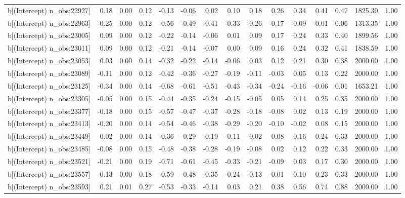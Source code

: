 \begin{table}[ht]
\begin{tabular}{rrrrrrrrrrrrrrr}
  b[(Intercept) n\_obs:22927] & 0.18 & 0.00 & 0.12 & -0.13 & -0.06 & 0.02 & 0.10 & 0.18 & 0.26 & 0.34 & 0.41 & 0.47 & 1825.30 & 1.00 \\ 
  b[(Intercept) n\_obs:22963] & -0.25 & 0.00 & 0.12 & -0.56 & -0.49 & -0.41 & -0.33 & -0.26 & -0.17 & -0.09 & -0.01 & 0.06 & 1313.35 & 1.00 \\ 
  b[(Intercept) n\_obs:23005] & 0.09 & 0.00 & 0.12 & -0.22 & -0.14 & -0.06 & 0.01 & 0.09 & 0.17 & 0.24 & 0.33 & 0.40 & 1899.56 & 1.00 \\ 
  b[(Intercept) n\_obs:23011] & 0.09 & 0.00 & 0.12 & -0.21 & -0.14 & -0.07 & 0.00 & 0.09 & 0.16 & 0.24 & 0.32 & 0.41 & 1838.59 & 1.00 \\ 
  b[(Intercept) n\_obs:23053] & 0.03 & 0.00 & 0.14 & -0.32 & -0.22 & -0.14 & -0.06 & 0.03 & 0.12 & 0.21 & 0.30 & 0.38 & 2000.00 & 1.00 \\ 
  b[(Intercept) n\_obs:23089] & -0.11 & 0.00 & 0.12 & -0.42 & -0.36 & -0.27 & -0.19 & -0.11 & -0.03 & 0.05 & 0.13 & 0.22 & 2000.00 & 1.00 \\ 
  b[(Intercept) n\_obs:23125] & -0.34 & 0.00 & 0.14 & -0.68 & -0.61 & -0.51 & -0.43 & -0.34 & -0.24 & -0.16 & -0.06 & 0.01 & 1653.21 & 1.00 \\ 
  b[(Intercept) n\_obs:23305] & -0.05 & 0.00 & 0.15 & -0.44 & -0.35 & -0.24 & -0.15 & -0.05 & 0.05 & 0.14 & 0.25 & 0.35 & 2000.00 & 1.00 \\ 
  b[(Intercept) n\_obs:23377] & -0.18 & 0.00 & 0.15 & -0.57 & -0.47 & -0.37 & -0.28 & -0.18 & -0.08 & 0.02 & 0.13 & 0.19 & 2000.00 & 1.00 \\ 
  b[(Intercept) n\_obs:23413] & -0.20 & 0.00 & 0.14 & -0.54 & -0.46 & -0.38 & -0.29 & -0.20 & -0.10 & -0.02 & 0.08 & 0.15 & 2000.00 & 1.00 \\ 
  b[(Intercept) n\_obs:23449] & -0.02 & 0.00 & 0.14 & -0.36 & -0.29 & -0.19 & -0.11 & -0.02 & 0.08 & 0.16 & 0.24 & 0.33 & 2000.00 & 1.00 \\ 
  b[(Intercept) n\_obs:23485] & -0.08 & 0.00 & 0.15 & -0.48 & -0.38 & -0.28 & -0.19 & -0.08 & 0.02 & 0.12 & 0.22 & 0.33 & 2000.00 & 1.00 \\ 
  b[(Intercept) n\_obs:23521] & -0.21 & 0.00 & 0.19 & -0.71 & -0.61 & -0.45 & -0.33 & -0.21 & -0.09 & 0.03 & 0.17 & 0.30 & 2000.00 & 1.00 \\ 
  b[(Intercept) n\_obs:23557] & -0.13 & 0.00 & 0.18 & -0.59 & -0.48 & -0.35 & -0.24 & -0.13 & -0.01 & 0.10 & 0.23 & 0.33 & 2000.00 & 1.00 \\ 
  b[(Intercept) n\_obs:23593] & 0.21 & 0.01 & 0.27 & -0.53 & -0.33 & -0.14 & 0.03 & 0.21 & 0.38 & 0.56 & 0.74 & 0.88 & 2000.00 & 1.00 \\ 

\end{tabular}
\end{table}
